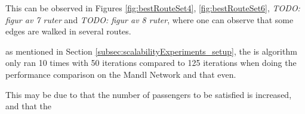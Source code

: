 This can be observed in Figures \vref{fig:bestRouteSet4}, \vref{fig:bestRouteSet6}, \emph{\color{blue} TODO: figur av 7 ruter} and \emph{\color{blue} TODO: figur av 8 ruter}, where one can observe that some edges are walked in several routes.  

as mentioned in Section \vref{subsec:scalabilityExperiments_setup}, the is algorithm only ran 10 times with 50 iterations compared to 125 iterations when doing the performance comparison on the Mandl Network and that even. 

This may be due to that the number of passengers to be satisfied is increased, and that the








